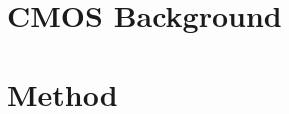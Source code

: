 \documentclass[journal]{IEEEtran}
\begin{document}
\section{CMOS Background}

\section{Method}



{\footnotesize

}
\end{document}
